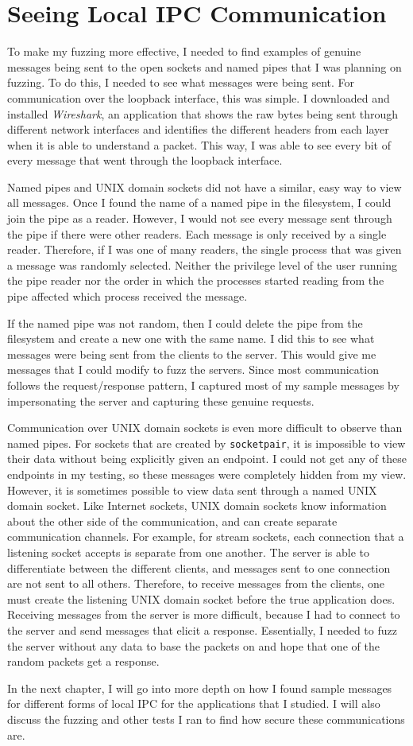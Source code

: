 \section{Seeing Local IPC Communication}
\label{sec:seeingLocalIPC}
To make my fuzzing more effective, I needed to find examples of genuine messages being sent to the open sockets and named pipes that I was planning on fuzzing.  To do this, I needed to see what messages were being sent.  For communication over the loopback interface, this was simple.  I downloaded and installed \textit{Wireshark}, an application that shows the raw bytes being sent through different network interfaces and identifies the different headers from each layer when it is able to understand a packet.  This way, I was able to see every bit of every message that went through the loopback interface.

Named pipes and UNIX domain sockets did not have a similar, easy way to view all messages.  Once I found the name of a named pipe in the filesystem, I could join the pipe as a reader.  However, I would not see every message sent through the pipe if there were other readers.  Each message is only received by a single reader.  Therefore, if I was one of many readers, the single process that was given a message was randomly selected.  Neither the privilege level of the user running the pipe reader nor the order in which the processes started reading from the pipe affected which process received the message.

If the named pipe was not random, then I could delete the pipe from the filesystem and create a new one with the same name.  I did this to see what messages were being sent from the clients to the server.  This would give me messages that I could modify to fuzz the servers.  Since most communication follows the request/response pattern, I captured most of my sample messages by impersonating the server and capturing these genuine requests.

Communication over UNIX domain sockets is even more difficult to observe than named pipes.  For sockets that are created by \texttt{socketpair}, it is impossible to view their data without being explicitly given an endpoint.  I could not get any of these endpoints in my testing, so these messages were completely hidden from my view.  However, it is sometimes possible to view data sent through a named UNIX domain socket.  Like Internet sockets, UNIX domain sockets know information about the other side of the communication, and can create separate communication channels.  For example, for stream sockets, each connection that a listening socket accepts is separate from one another.  The server is able to differentiate between the different clients, and messages sent to one connection are not sent to all others.  Therefore, to receive messages from the clients, one must create the listening UNIX domain socket before the true application does.  Receiving messages from the server is more difficult, because I had to connect to the server and send messages that elicit a response.  Essentially, I needed to fuzz the server without any data to base the packets on and hope that one of the random packets get a response.

In the next chapter, I will go into more depth on how I found sample messages for different forms of local IPC for the applications that I studied.  I will also discuss the fuzzing and other tests I ran to find how secure these communications are.
